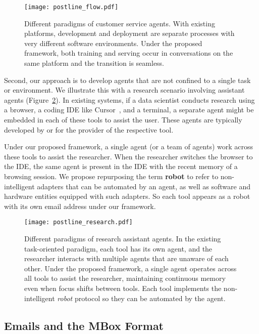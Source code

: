 \begin{figure}[h]
    \centering
    \texttt{[image: postline\_flow.pdf]}
    \caption{Different paradigms of customer service agents.  With existing platforms, development and deployment are separate processes with very different software environments.  Under the proposed framework, both training and serving occur in conversations on the same platform and the transition is seamless.}
    \label{fig:postline_flow}
\end{figure}

Second, our approach is to develop agents that are not confined to a single task or environment. We illustrate this with a research scenario involving assistant agents (Figure~\ref{fig:postline_research}). In existing systems, if a data scientist conducts research using a browser, a coding IDE like Cursor~\cite{cursor24}, and a terminal, a separate agent might be embedded in each of these tools to assist the user. These agents are typically developed by or for the provider of the respective tool.

Under our proposed framework, a single agent (or a team of agents) work across these tools to assist the researcher.  When the researcher switches the browser to the IDE, the same agent is present in the IDE with the recent memory of a browsing session. We propose repurposing the term {\bf robot} to refer to non-intelligent adapters that can be automated by an agent, as well as software and hardware entities equipped with such adapters.  So each tool appears as a robot with its own email address under our framework.

\begin{figure}[h]
    \centering
    \texttt{[image: postline\_research.pdf]}
    \caption{
    Different paradigms of research assistant agents.
    In the existing task-oriented paradigm, each tool has its own agent, and the researcher interacts with multiple agents that are unaware of each other. Under the proposed framework, a single agent operates across all tools to assist the researcher, maintaining continuous memory even when focus shifts between tools.  Each tool implements the non-intelligent \emph{robot} protocol so they can be automated by the agent.
    }
    \label{fig:postline_research}
\end{figure}

\subsection{Emails and the MBox Format}

